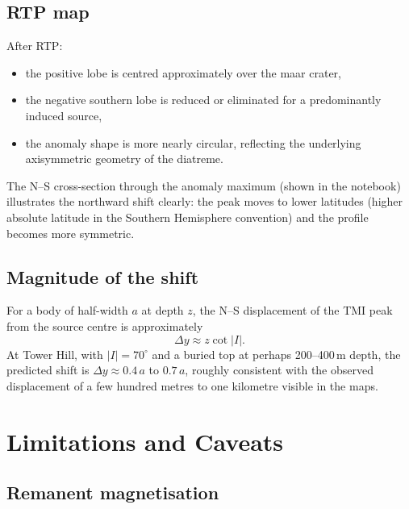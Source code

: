 \documentclass[11pt,a4paper]{article}
\begin{document}
\subsection{RTP map}

After RTP:
\begin{itemize}
  \item the positive lobe is centred approximately over the maar crater,
  \item the negative southern lobe is reduced or eliminated for a predominantly
        induced source,
  \item the anomaly shape is more nearly circular, reflecting the underlying
        axisymmetric geometry of the diatreme.
\end{itemize}

The N--S cross-section through the anomaly maximum (shown in the notebook)
illustrates the northward shift clearly: the peak moves to lower latitudes
(higher absolute latitude in the Southern Hemisphere convention) and the
profile becomes more symmetric.

\subsection{Magnitude of the shift}

For a body of half-width $a$ at depth $z$, the N--S displacement of the
TMI peak from the source centre is approximately
\begin{equation}
\Delta y \approx z \cot|I|.
\end{equation}
At Tower Hill, with $|I| = 70^\circ$ and a buried top at perhaps 200--400\,m
depth, the predicted shift is $\Delta y \approx 0.4\,a$ to $0.7\,a$,
roughly consistent with the observed displacement of a few hundred metres
to one kilometre visible in the maps.

\section{Limitations and Caveats}
\label{sec:limitations}

\subsection{Remanent magnetisation}
\end{document}
